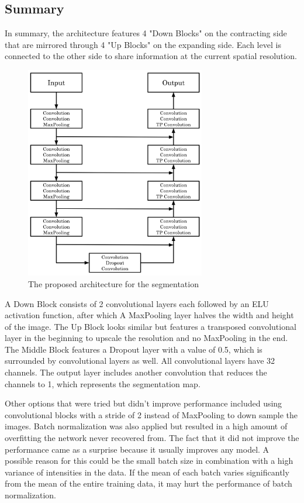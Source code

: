 \subsection{Summary}

In summary, the architecture features 4 "Down Blocks" on the contracting side that are mirrored through 4 "Up Blocks" on the expanding side. Each level is connected to the other side to share information at the current spatial resolution.

\begin{figure}[H]
\centering
\par
\includegraphics[width=0.7\textwidth]{imgs/model.png}
\caption{The proposed architecture for the segmentation}
\par
\end{figure}

A Down Block consists of 2 convolutional layers each followed by an ELU activation function, after which A MaxPooling layer halves the width and height of the image. The Up Block looks similar but features a transposed convolutional layer in the beginning to upscale the resolution and no MaxPooling in the end. The Middle Block features a Dropout layer with a value of 0.5, which is surrounded by convolutional layers as well. All convolutional layers have 32 channels. The output layer includes another convolution that reduces the channels to 1, which represents the segmentation map.

\newpage

Other options that were tried but didn't improve performance included using convolutional blocks with a stride of 2 instead of MaxPooling to down sample the images. Batch normalization was also applied but resulted in a high amount of overfitting the network never recovered from. The fact that it did not improve the performance came as a surprise because it usually improves any model. A possible reason for this could be the small batch size in combination with a high variance of intensities in the data. If the mean of each batch varies significantly from the mean of the entire training data, it may hurt the performance of batch normalization.

\newpage
